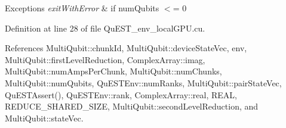 \begin{DoxyExceptions}{Exceptions}
{\em exit\+With\+Error} & if {\ttfamily num\+Qubits} $<$= 0 \\
\hline
\end{DoxyExceptions}


Definition at line 28 of file Qu\+E\+S\+T\+\_\+env\+\_\+local\+G\+P\+U.\+cu.



References Multi\+Qubit\+::chunk\+Id, Multi\+Qubit\+::device\+State\+Vec, env, Multi\+Qubit\+::first\+Level\+Reduction, Complex\+Array\+::imag, Multi\+Qubit\+::num\+Amps\+Per\+Chunk, Multi\+Qubit\+::num\+Chunks, Multi\+Qubit\+::num\+Qubits, Qu\+E\+S\+T\+Env\+::num\+Ranks, Multi\+Qubit\+::pair\+State\+Vec, Qu\+E\+S\+T\+Assert(), Qu\+E\+S\+T\+Env\+::rank, Complex\+Array\+::real, R\+E\+AL, R\+E\+D\+U\+C\+E\+\_\+\+S\+H\+A\+R\+E\+D\+\_\+\+S\+I\+ZE, Multi\+Qubit\+::second\+Level\+Reduction, and Multi\+Qubit\+::state\+Vec.


